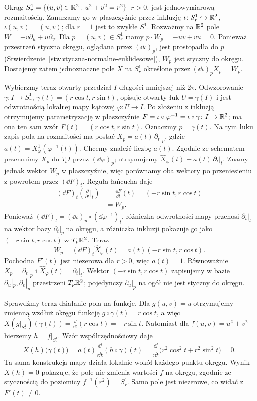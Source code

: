\begin{przyklad}
Okrąg $S_r^1=\{(u,v)\in\mathbb{R}^2:u^2+v^2=r^2\}$, $r>0$,
jest jednowymiarową rozmaitością. Zanurzamy go w płaszczyźnie
przez inkluzję $\iota\colon S_r^1\hookrightarrow\mathbb{R}^2$,
$\iota(u,v)=(u,v)$; dla $r=1$ jest to zwykłe $S^1$.
Rozważmy na $\mathbb{R}^2$ pole
$W=-v\partial_u+u\partial_v$. Dla $p=(u,v)\in S_r^1$ mamy
$p\cdot W_p=-uv+vu=0$. Ponieważ przestrzeń styczna okręgu,
oglądana przez $(\dd\iota)_p$, jest prostopadła do $p$
(Stwierdzenie~\ref{stw:styczna-normalne-euklidesowe}),
$W_p$ jest styczny do okręgu. Dostajemy zatem jednoznaczne
pole $X$ na $S_r^1$ określone przez $(\dd\iota)_pX_p=W_p$.

Wybierzmy teraz otwarty przedział $I$ długości mniejszej niż $2\pi$.
Odwzorowanie $\gamma\colon I\to S_r^1$,
$\gamma(t)=(r\cos t,r\sin t)$, opisuje otwarty łuk
$U=\gamma(I)$ i jest odwrotnością lokalnej mapy kątowej
$\varphi\colon U\to I$. Po złożeniu z inkluzją otrzymujemy
parametryzację w płaszczyźnie
$F=\iota\circ\varphi^{-1}=\iota\circ\gamma\colon I\to\mathbb{R}^2$;
ma ona ten sam wzór $F(t)=(r\cos t,r\sin t)$.
Oznaczmy $p=\gamma(t)$. Na tym łuku zapis pola na rozmaitości
ma postać $X_p=a(t)\,\partial_t|_p$, gdzie
$a(t)=X_\varphi^1(\varphi^{-1}(t))$.
Chcemy znaleźć liczbę $a(t)$.
Zgodnie ze schematem przenosimy $X_p$ do $T_tI$ przez
$(\dd\varphi)_p$; otrzymujemy
$\widehat X_\varphi(t)=a(t)\,\partial_t|_t$.
Znamy jednak wektor $W_p$ w płaszczyźnie, więc porównamy oba
wektory po przeniesieniu z powrotem przez $(\dd F)_t$.
Reguła łańcucha daje
\[
\begin{aligned}
(\dd F)_t\!\left(\frac{\partial}{\partial t}\Big|_t\right)
&=\frac{\dd F}{\dd t}(t)
=(-r\sin t,r\cos t)\\
&=W_p.
\end{aligned}
\]
Ponieważ $(\dd F)_t=(\dd\iota)_p\circ(\dd\varphi^{-1})_t$,
różniczka odwrotności mapy przenosi $\partial_t|_t$ na wektor
bazy $\partial_t|_p$ na okręgu, a różniczka inkluzji pokazuje
go jako $(-r\sin t,r\cos t)$ w $T_p\mathbb{R}^2$.
Teraz
\[
W_p=(\dd F)_t\widehat X_\varphi(t)
=a(t)(-r\sin t,r\cos t).
\]
Pochodna $F'(t)$ jest niezerowa dla $r>0$, więc $a(t)=1$.
Równoważnie $X_p=\partial_t|_p$ i
$\widehat X_\varphi(t)=\partial_t|_t$. Wektor
$(-r\sin t,r\cos t)$ zapisujemy w bazie
$\partial_u|_p,\partial_v|_p$ przestrzeni $T_p\mathbb{R}^2$;
pojedynczy $\partial_u|_p$ na ogół nie jest styczny do okręgu.

Sprawdźmy teraz działanie pola na funkcje. Dla $g(u,v)=u$
otrzymujemy zmienną wzdłuż okręgu funkcję
$g\circ\gamma(t)=r\cos t$, a więc
$X(g|_{S_r^1})(\gamma(t))=\frac{\dd}{\dd t}(r\cos t)=-r\sin t$.
Natomiast dla $f(u,v)=u^2+v^2$ bierzemy
$h=f|_{S_r^1}$. Wzór współrzędnościowy daje
\[
X(h)\bigl(\gamma(t)\bigr)
=a(t)\frac{\dd}{\dd t}(h\circ\gamma)(t)
=\frac{\dd}{\dd t}\bigl(r^2\cos^2t+r^2\sin^2t\bigr)=0.
\]
Ta sama konstrukcja mapy działa lokalnie wokół każdego punktu okręgu.
Wynik $X(h)=0$ pokazuje, że pole nie zmienia wartości $f$ na
okręgu, zgodnie ze stycznością do poziomicy $f^{-1}(r^2)=S_r^1$.
Samo pole jest niezerowe, co widać z $F'(t)\ne0$.
\end{przyklad}

